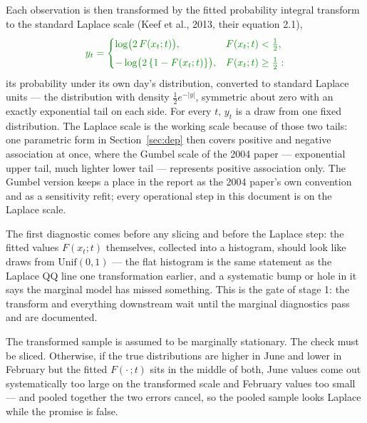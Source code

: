 \documentclass[11pt]{article}
\begin{document}
Each observation is then transformed by the fitted probability integral transform {\color{green}to the standard Laplace scale (Keef et al., 2013, their equation 2.1)},
\begin{equation}\label{eq:pit}
{\color{green}
y_t =
\begin{cases}
\log\bigl(2\, F(x_t; t)\bigr), & F(x_t; t) < \tfrac{1}{2},\\[4pt]
-\log\bigl(2\,\{1 - F(x_t; t)\}\bigr), & F(x_t; t) \ge \tfrac{1}{2}:
\end{cases}}
\end{equation}
its probability under its own day's distribution, converted to {\color{green}standard Laplace units --- the distribution with density $\tfrac{1}{2} e^{-|y|}$, symmetric about zero with an exactly exponential tail on each side}. For every $t$, $y_t$ is a draw from one fixed distribution. {\color{green}The Laplace scale is the working scale because of those two tails: one parametric form in Section~\ref{sec:dep} then covers positive and negative association at once, where the Gumbel scale of the 2004 paper --- exponential upper tail, much lighter lower tail --- represents positive association only. The Gumbel version keeps a place in the report as the 2004 paper's own convention and as a sensitivity refit; every operational step in this document is on the Laplace scale.}

The first diagnostic comes before any slicing and before the {\color{green}Laplace} step: the fitted values $F(x_t; t)$ themselves, collected into a histogram, should look like draws from $\mathrm{Unif}(0,1)$ --- the flat histogram is the same statement as the {\color{green}Laplace} QQ line one transformation earlier, and a systematic bump or hole in it says the marginal model has missed something. This is the gate of stage 1: the transform and everything downstream wait until the marginal diagnostics pass and are documented.

The transformed sample is assumed to be marginally stationary. The check must be sliced. Otherwise, if the true distributions are higher in June and lower in February but the fitted $F(\cdot\,; t)$ sits in the middle of both, June values come out systematically too large on the transformed scale and February values too small --- and pooled together the two errors cancel, so the pooled sample looks {\color{green}Laplace} while the promise is false. 
\end{document}
